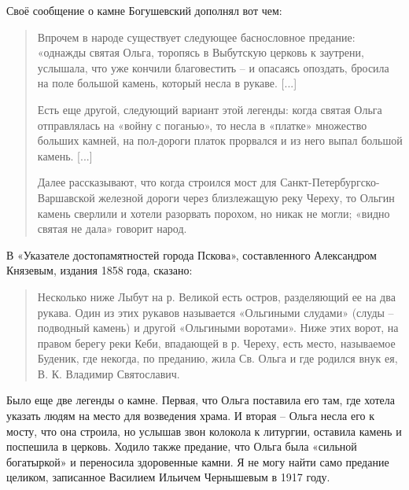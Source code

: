Своё сообщение о камне Богушевский дополнял вот чем:

\begin{quotation}
Впрочем в народе существует следующее баснословное предание: «однажды святая Ольга, торопясь в Выбутскую церковь к заутрени, услышала, что уже кончили благовестить – и опасаясь опоздать, бросила на поле большой камень, который несла в рукаве. [...]

Есть еще другой, следующий вариант этой легенды: когда святая Ольга отправлялась на «войну с поганью», то несла в «платке» множество больших камней, на пол-дороги платок прорвался и из него выпал большой камень. [...]

Далее рассказывают, что когда строился мост для Санкт-Петербургско-Варшавской железной дороги через близлежащую реку Череху, то Ольгин камень сверлили и хотели разорвать порохом, но никак не могли; «видно святая не дала» говорит народ.
\end{quotation}



В «Указателе достопамятностей города Пскова», составленного Александром Князевым, издания 1858 года, сказано:

\begin{quotation}
Несколько ниже Лыбут на р. Великой есть остров, разделяющий ее на два рукава. Один из этих рукавов называется «Ольгиными слудами» (слуды – подводный камень) и другой «Ольгиными воротами». Ниже этих ворот, на правом берегу реки Кеби, впадающей в р. Череху, есть место, называемое Буденик, где некогда, по преданию, жила Св. Ольга и где родился внук ея, В. К. Владимир Святославич.
\end{quotation}

Было еще две легенды о камне. Первая, что Ольга поставила его там, где хотела указать людям на место для возведения храма. И вторая – Ольга несла его к мосту, что она строила, но услышав звон колокола к литургии, оставила камень и поспешила в церковь. Ходило также предание, что Ольга была «сильной богатыркой» и переносила здоровенные камни. Я не могу найти само предание целиком, записанное Василием Ильичем Чернышевым в 1917 году.

